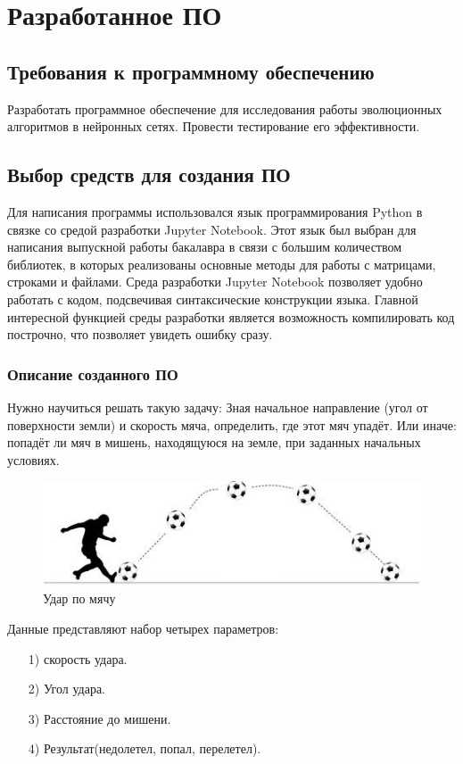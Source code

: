\newpage

\chapter{Разработанное ПО}

\section{Требования к программному обеспечению}
\indent \indent Разработать программное обеспечение для исследования работы эволюционных алгоритмов в нейронных сетях. Провести тестирование его эффективности.

\section{Выбор средств для создания ПО}

\indent \indent Для написания программы использовался язык программирования Python в связке со средой разработки Jupyter Notebook. Этот язык был выбран для написания выпускной работы бакалавра в связи с большим количеством библиотек, в которых реализованы основные методы для работы с матрицами, строками и файлами.
Среда разработки Jupyter Notebook позволяет удобно работать с кодом, подсвечивая синтаксические конструкции языка. Главной интересной функцией среды разработки является возможность компилировать код построчно, что позволяет увидеть ошибку сразу. 

\subsection{Описание созданного ПО}

\indent \indent Нужно научиться решать такую задачу:
Зная начальное направление (угол от поверхности земли) и скорость мяча, определить, где этот мяч упадёт. Или иначе: попадёт ли мяч в мишень, находящуюся на земле, при заданных начальных условиях.

\begin{figure}[H]
  \centering
  \includegraphics[width=0.5\linewidth]{./img/footbal}
  \caption{Удар по мячу}
  \label{fig:mpr} 
\end{figure} 

Данные представляют набор четырех параметров:
\begin{enumerate}
  \item[1)] скорость удара.
  \item[2)] Угол удара.
  \item[3)] Расстояние до мишени.
  \item[4)] Результат(недолетел, попал, перелетел).
\end{enumerate}

